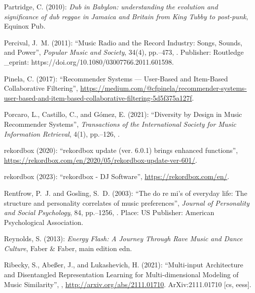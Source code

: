 \documentclass[11pt,titlepage,oneside]{book}
\begin{document}
\begin{thebibliography}{97}
	Partridge, C. (2010): \textit{Dub in {Babylon}: understanding the evolution and
		significance of dub reggae in {Jamaica} and {Britain} from {King} {Tubby} to
		post-punk}, Equinox Pub.
	
	Percival, J.~M. (2011): \enquote{Music {Radio} and the {Record} {Industry}:
		{Songs}, {Sounds}, and {Power}}, \textit{Popular Music and Society}, 34(4),
	pp.--473, . Publisher:
	Routledge \_eprint: https://doi.org/10.1080/03007766.2011.601598.
	
	Pinela, C. (2017): \enquote{Recommender {Systems} — {User}-{Based} and
		{Item}-{Based} {Collaborative} {Filtering}},
	\urlprefix\url{https://medium.com/@cfpinela/recommender-systems-user-based-and-item-based-collaborative-filtering-5d5f375a127f}.
	
	Porcaro, L., Castillo, C., and Gómez, E. (2021): \enquote{Diversity by
		{Design} in {Music} {Recommender} {Systems}}, \textit{Transactions of the
		International Society for Music Information Retrieval}, 4(1),
	pp.--126, .
	
	rekordbox (2020): \enquote{rekordbox update (ver. 6.0.1) brings enhanced
		functions},
	\urlprefix\url{https://rekordbox.com/en/2020/05/rekordbox-update-ver-601/}.
	
	rekordbox (2023): \enquote{rekordbox - {DJ} {Software}},
	\urlprefix\url{https://rekordbox.com/en/}.
	
	Rentfrow, P.~J. and Gosling, S.~D. (2003): \enquote{The do re mi's of everyday
		life: {The} structure and personality correlates of music preferences},
	\textit{Journal of Personality and Social Psychology}, 84, pp.--1256, . Place: US Publisher: American
	Psychological Association.
	
	Reynolds, S. (2013): \textit{Energy {Flash}: {A} {Journey} {Through} {Rave}
		{Music} and {Dance} {Culture}}, Faber \& Faber, main edition edn.
	
	Ribecky, S., Abeßer, J., and Lukashevich, H. (2021): \enquote{Multi-input
		{Architecture} and {Disentangled} {Representation} {Learning} for
		{Multi}-dimensional {Modeling} of {Music} {Similarity}},
	,
	\urlprefix\url{http://arxiv.org/abs/2111.01710}. ArXiv:2111.01710 [cs, eess].
	

\end{thebibliography}
\end{document}

